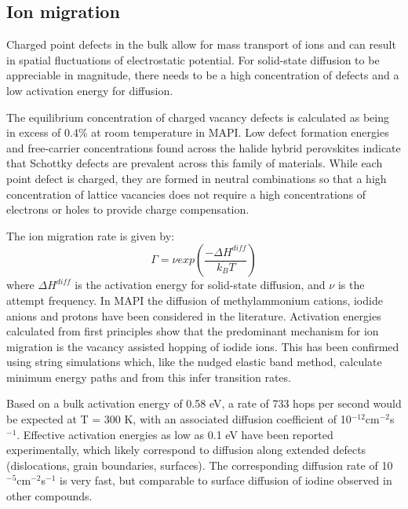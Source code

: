 \subsection{Ion migration} 

Charged point defects in the bulk allow for mass transport of ions and can result in spatial fluctuations of electrostatic potential.
For solid-state diffusion to be appreciable in magnitude, there needs to be a high concentration of defects and a low activation energy for diffusion. 

The equilibrium concentration of charged vacancy defects is calculated as being in excess of 0.4\% at room temperature in MAPI.\autocite{Walsh2015}
Low defect formation energies and free-carrier concentrations found across the halide hybrid perovskites indicate that Schottky defects are prevalent across this family of materials.
While each point defect is charged, they are formed in neutral combinations so that a high concentration of lattice vacancies does not require a high concentrations of electrons or holes to provide charge compensation. 

The ion migration rate is given by:
%
\begin{equation}
\Gamma = \nu exp \left( \frac{-\Delta H^{diff}}{k_BT} \right)
\end{equation}
%
where $\Delta H^{diff}$ is the activation energy for solid-state diffusion,
and $\nu$ is the attempt frequency. 
In MAPI the diffusion of methylammonium cations, iodide anions and protons have been considered in the literature. 
Activation energies calculated from first principles show that the predominant mechanism for ion migration is the vacancy assisted hopping of iodide ions.\autocite{Eames2015a}
This has been confirmed using string simulations\autocite{Meloni2016a} which, like the nudged elastic band method, calculate minimum energy paths and from this infer transition rates.

Based on a bulk activation energy of 0.58 eV\autocite{Eames2015a}, a rate of 733 hops per second would be expected at T = 300 K, with an associated diffusion coefficient of 10$^{-12}$cm$^{-2}$s$^{-1}$.
Effective activation energies as low as 0.1 eV have been reported experimentally,\autocite{Bryant2015,Game2017} which likely 
correspond to diffusion along extended defects (dislocations, grain boundaries, surfaces)\autocite{Shao2016a,Yun2016}.
The corresponding diffusion rate of 10$^{-5}$cm$^{-2}$s$^{-1}$ is very fast, but comparable to surface 
diffusion of iodine observed in other compounds.\autocite{Chandra1980}

